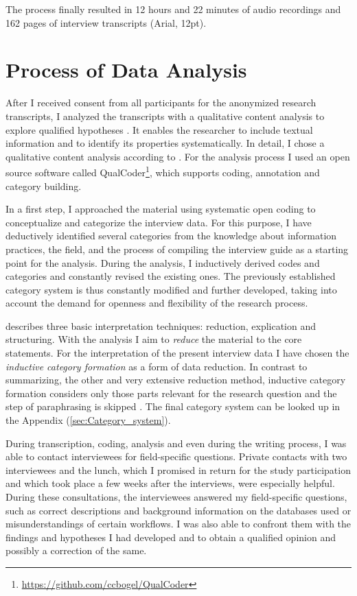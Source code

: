 \documentclass[12pt, a4paper, titlepage, oneside, abstract=true, toc=listof, toc=bibliography, BCOR=1cm]{scrreprt}
\begin{document}
The process finally resulted in 12 hours and 22 minutes of audio recordings and 162 pages of interview transcripts (Arial, 12pt). 

\section{Process of Data Analysis}
After I received consent from all participants for the anonymized research transcripts, I analyzed the transcripts with a qualitative content analysis to explore qualified hypotheses \citep{Kohlbacher2006, Krippendorff2012, Mayring2000, Mayring2014}. It enables the researcher to include textual information and to identify its properties systematically. In detail, I chose a qualitative content analysis according to \citet{Mayring2014}. For the analysis process I used an open source software called QualCoder\footnote{\url{https://github.com/ccbogel/QualCoder}}, which supports coding, annotation and category building. 

In a first step, I approached the material using systematic open coding \citep{Corbin1990} to conceptualize and categorize the interview data. For this purpose, I have deductively identified several categories from the knowledge about information practices, the field, and the process of compiling the interview guide as a starting point for the analysis. During the analysis, I inductively derived codes and categories and constantly revised the existing ones. The previously established category system is thus constantly modified and further developed, taking into account the demand for openness and flexibility of the research process. 

\citet[p. 65]{Mayring2014} describes three basic interpretation techniques: reduction, explication and structuring. With the analysis I aim to \textit{reduce} the material to the core statements. For the interpretation of the present interview data I have chosen the \textit{inductive category formation} as a form of data reduction. In contrast to summarizing, the other and very extensive reduction method, inductive category formation considers only those parts relevant for the research question and the step of paraphrasing is skipped \cite[p. 79]{Mayring2014}. The final category system can be looked up in the Appendix (\ref{sec:Category_system}).

During transcription, coding, analysis and even during the writing process, I was able to contact interviewees for field-specific questions. Private contacts with two interviewees and the lunch, which I promised in return for the study participation and which took place a few weeks after the interviews, were especially helpful. During these consultations, the interviewees answered my field-specific questions, such as correct descriptions and background information on the databases used or misunderstandings of certain workflows. I was also able to confront them with the findings and hypotheses I had developed and to obtain a qualified opinion and possibly a correction of the same.
	
\end{document}

